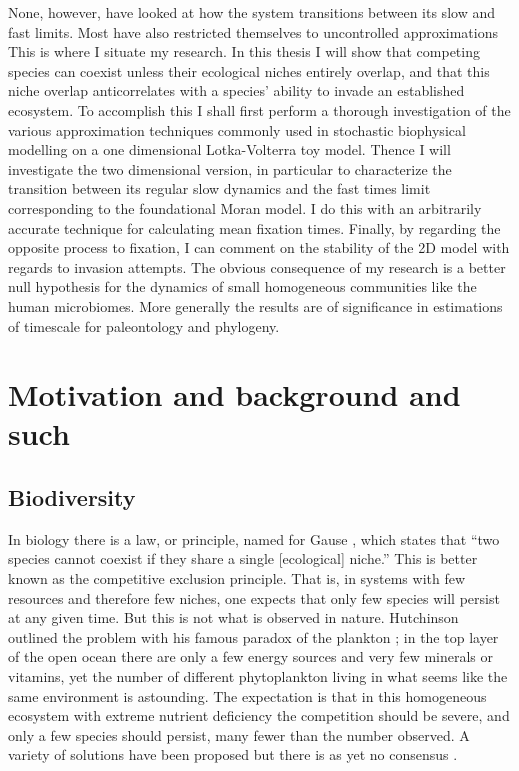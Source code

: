 None, however, have looked at how the system transitions between its slow and fast limits. 
Most have also restricted themselves to uncontrolled approximations
This is where I situate my research. 
In this thesis I will show that competing species can coexist unless their ecological niches entirely overlap, and that this niche overlap anticorrelates with a species' ability to invade an established ecosystem. 
To accomplish this I shall first perform a thorough investigation of the various approximation techniques commonly used in stochastic biophysical modelling on a one dimensional Lotka-Volterra toy model. 
Thence I will investigate the two dimensional version, in particular to characterize the transition between its regular slow dynamics and the fast times limit corresponding to the foundational Moran model. 
I do this with an arbitrarily accurate technique for calculating mean fixation times. 
Finally, by regarding the opposite process to fixation, I can comment on the stability of the 2D model with regards to invasion attempts. 
The obvious consequence of my research is a better null hypothesis for the dynamics of small homogeneous communities like the human microbiomes. 
More generally the results are of significance in estimations of timescale for paleontology and phylogeny. 



\section{Motivation and background and such}
\subsection{Biodiversity}
In biology there is a law, or principle, named for Gause \cite{Gause1934}, which states that ``two species cannot coexist if they share a single [ecological] niche.'' 
This is better known as the competitive exclusion principle. %
That is, in systems with few resources and therefore few niches, one expects that only few species will persist at any given time. 
But this is not what is observed in nature. 
Hutchinson outlined the problem with his famous paradox of the plankton \cite{Hutchinson1961}; %
in the top layer of the open ocean there are only a few energy sources and very few minerals or vitamins, yet the number of different phytoplankton living in what seems like the same environment is astounding. 
The expectation is that in this homogeneous ecosystem with extreme nutrient deficiency the competition should be severe, and only a few species should persist, many fewer than the number observed. 
A variety of solutions have been proposed but there is as yet no consensus \cite{Roy2007}. 

